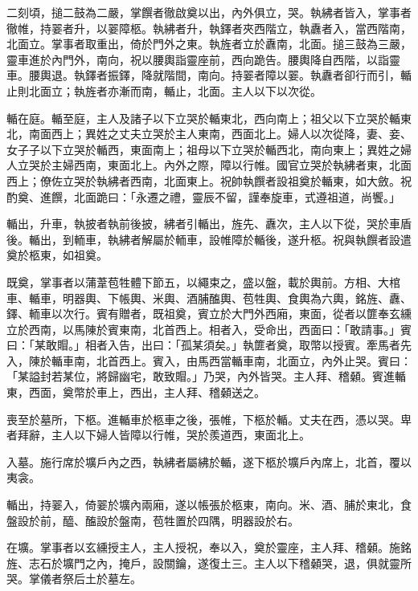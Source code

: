 \begin{pinyinscope}
 二刻頃，搥二鼓為二嚴，掌饌者徹啟奠以出，內外俱立，哭。執紼者皆入，掌事者徹帷，持翣者升，以翣障柩。執紼者升，執鐸者夾西階立，執纛者入，當西階南，北面立。掌事者取重出，倚於門外之東。執旌者立於纛南，北面。搥三鼓為三嚴，靈車進於內門外，南向，祝以腰輿詣靈座前，西向跪告。腰輿降自西階，以詣靈車。腰輿退。執鐸者振鐸，降就階間，南向。持翣者障以翣。執纛者卻行而引，輴止則北面立；執旌者亦漸而南，輴止，北面。主人以下以次從。



 輴在庭。輴至庭，主人及諸子以下立哭於輴東北，西向南上；祖父以下立哭於輴東北，南面西上；異姓之丈夫立哭於主人東南，西面北上。婦人以次從降，妻、妾、女子子以下立哭於輴西，東面南上；祖母以下立哭於輴西北，南向東上；異姓之婦人立哭於主婦西南，東面北上。內外之際，障以行帷。國官立哭於執紼者東，北面西上；僚佐立哭於執紼者西南，北面東上。祝帥執饌者設祖奠於輴東，如大斂。祝酌奠、進饌，北面跪曰：「永遷之禮，靈辰不留，謹奉旋車，式遵祖道，尚饗。」



 輴出，升車，執披者執前後披，紼者引輴出，旌先、纛次，主人以下從，哭於車盾後。輴出，到輀車，執紼者解屬於輀車，設帷障於輴後，遂升柩。祝與執饌者設遣奠於柩東，如祖奠。



 既奠，掌事者以蒲葦苞牲體下節五，以繩束之，盛以盤，載於輿前。方相、大棺車、輴車，明器輿、下帳輿、米輿、酒脯醢輿、苞牲輿、食輿為六輿，銘旌、纛、鐸、輀車以次行。賓有贈者，既祖奠，賓立於大門外西廂，東面，從者以篚奉玄纁立於西南，以馬陳於賓東南，北首西上。相者入，受命出，西面曰：「敢請事。」賓曰：「某敢賵。」相者入告，出曰：「孤某須矣。」執篚者奠，取幣以授賓。牽馬者先入，陳於輴車南，北首西上。賓入，由馬西當輴車南，北面立，內外止哭。賓曰：「某謚封若某位，將歸幽宅，敢致賵。」乃哭，內外皆哭。主人拜、稽顙。賓進輴東，西面，奠幣於車上，西出，主人拜、稽顙送之。



 喪至於墓所，下柩。進輴車於柩車之後，張帷，下柩於輴。丈夫在西，憑以哭。卑者拜辭，主人以下婦人皆障以行帷，哭於羨道西，東面北上。



 入墓。施行席於壙戶內之西，執紼者屬紼於輴，遂下柩於壙戶內席上，北首，覆以夷衾。



 輴出，持翣入，倚翣於壙內兩廂，遂以帳張於柩東，南向。米、酒、脯於東北，食盤設於前，醯、醢設於盤南，苞牲置於四隅，明器設於右。



 在壙。掌事者以玄纁授主人，主人授祝，奉以入，奠於靈座，主人拜、稽顙。施銘旌、志石於壙門之內，掩戶，設關鑰，遂復土三。主人以下稽顙哭，退，俱就靈所哭。掌儀者祭后土於墓左。




\end{pinyinscope}
